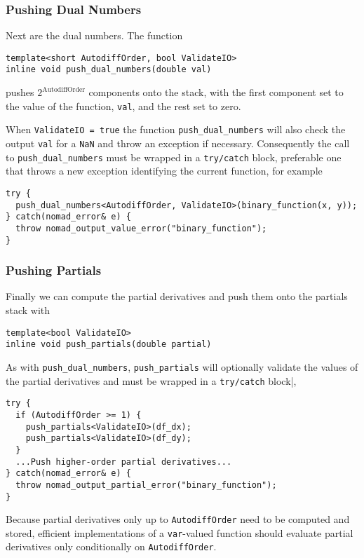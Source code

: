 \subsubsection{Pushing Dual Numbers}

Next are the dual numbers.  The function
%
\begin{verbatim}
template<short AutodiffOrder, bool ValidateIO>
inline void push_dual_numbers(double val)
\end{verbatim}
%
pushes $2^{\mathrm{AutodiffOrder}}$ components onto the stack, with
the first component set to the value of the function, \verb|val|, and the
rest set to zero.

When \verb|ValidateIO = true| the function \verb|push_dual_numbers|
will also check the output \verb|val| for a \verb|NaN| and throw an
exception if necessary.  Consequently the call to \verb|push_dual_numbers|
must be wrapped in a \verb|try/catch| block, preferable one that throws
a new exception identifying the current function, for example
%
\begin{verbatim}
try {
  push_dual_numbers<AutodiffOrder, ValidateIO>(binary_function(x, y));
} catch(nomad_error& e) {
  throw nomad_output_value_error("binary_function");
}
\end{verbatim}

\subsubsection{Pushing Partials}

Finally we can compute the partial derivatives and push them onto the
partials stack with
%
\begin{verbatim}
template<bool ValidateIO>
inline void push_partials(double partial)
\end{verbatim}
%
As with \verb|push_dual_numbers|, \verb|push_partials| will optionally
validate the values of the partial derivatives and must be wrapped in
a \verb|try/catch| block|,
%
\begin{verbatim}
try {
  if (AutodiffOrder >= 1) {
    push_partials<ValidateIO>(df_dx);
    push_partials<ValidateIO>(df_dy);
  }
  ...Push higher-order partial derivatives...
} catch(nomad_error& e) {
  throw nomad_output_partial_error("binary_function");
}
\end{verbatim}

Because partial derivatives only up to \verb|AutodiffOrder| need to be
computed and stored, efficient implementations of a \verb|var|-valued
function should evaluate partial derivatives only conditionally on
\verb|AutodiffOrder|.

